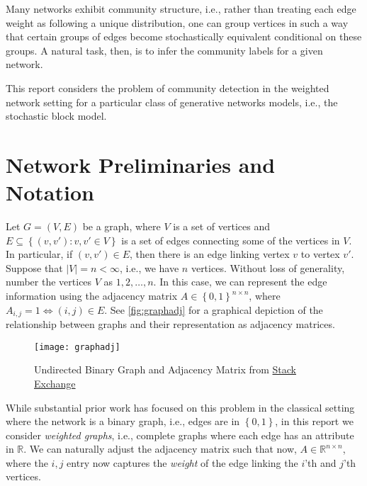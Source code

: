 \documentclass[12pt]{article}   %
\begin{document}
Many networks exhibit community structure, i.e., rather than treating each edge weight as following a unique distribution, one can group vertices in such a way that certain groups of edges become stochastically equivalent conditional on these groups.
A natural task, then, is to infer the community labels for a given network.

This report considers the problem of community detection in the weighted network setting for a particular class of generative networks models, i.e., the stochastic block model.

\section{Network Preliminaries and Notation}
\label{sec:netw-prel-notat}


Let $G=(V, E)$ be a graph, where $V$ is a set of vertices and $E \subseteq \left\{ (v, v') : v, v' \in V \right\}$ is a set of edges connecting some of the vertices in $V$.
In particular, if $(v, v') \in E$, then there is an edge linking vertex $v$ to vertex $v'$.
Suppose that $\lvert V \rvert = n < \infty$, i.e., we have $n$ vertices.
Without loss of generality, number the vertices $V$ as $1, 2, \ldots, n$.
In this case, we can represent the edge information using the adjacency matrix $A \in \left\{ 0, 1 \right\}^{n \times n}$, where $A_{i,j} = 1 \iff (i,j) \in E$.
See \autoref{fig:graphadj} for a graphical depiction of the relationship between graphs and their representation as adjacency matrices.

\begin{figure}[h]
  \centering
  \texttt{[image: graphadj]}
  \caption{Undirected Binary Graph and Adjacency Matrix from \href{https://cs.stackexchange.com/questions/71609/adjacency-matrix-and-recognizing-hierarchy}{Stack Exchange}}
  \label{fig:graphadj}
\end{figure}


While substantial prior work has focused on this problem in the classical setting where the network is a binary graph, i.e., edges are in $\left\{ 0,1 \right\}$, in this report we consider \emph{weighted graphs}, i.e., complete graphs where each edge has an attribute in $\mathbb{R}$.
We can naturally adjust the adjacency matrix such that now, $A \in \mathbb{R}^{n \times n}$, where the $i,j$ entry now captures the \emph{weight} of the edge linking the $i$'th and $j$'th vertices.
\end{document}

